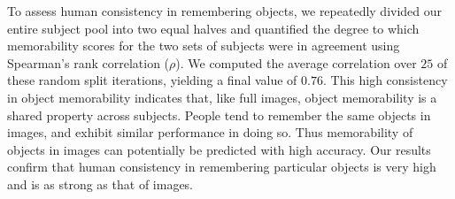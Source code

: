 To assess human consistency in remembering objects, we repeatedly divided our entire subject pool into two equal halves and quantified the degree to which memorability scores for the two sets of subjects were in agreement using Spearman’s rank correlation ($\rho$). We computed the average correlation over $25$ of these random split iterations, yielding a final value of $0.76$. This high consistency in object memorability indicates that, like full images, object memorability is a shared property across subjects. People tend to remember the same objects in images, and exhibit similar performance in doing so. Thus memorability of objects in images can potentially be predicted with high accuracy. Our results confirm that human consistency in remembering particular objects is very high and is as strong as that of images.
